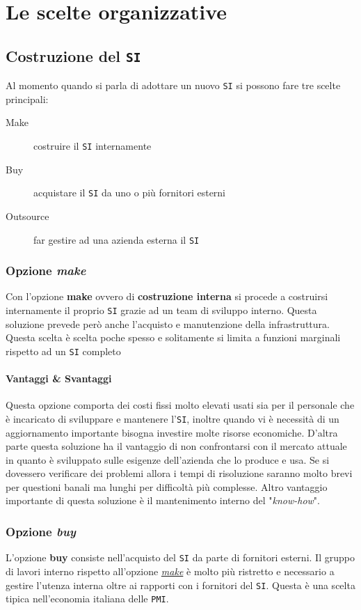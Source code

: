 \chapter{Le scelte organizzative}
\thispagestyle{chapterInit}
\section{Costruzione del \texttt{SI}}
    Al momento quando si parla di adottare un nuovo \texttt{SI} si possono fare tre scelte principali:
    \begin{description}
        \item[Make] costruire il \texttt{SI} internamente
        \item[Buy] acquistare il \texttt{SI} da uno o più fornitori esterni
        \item[Outsource] far gestire ad una azienda esterna il \texttt{SI}
    \end{description}
    \subsection{Opzione \textit{make}}
    \label{sec:opzMake}
        Con l'opzione \textbf{make} ovvero di \textbf{costruzione interna} si procede a costruirsi internamente il proprio \texttt{SI} grazie ad un team di sviluppo interno. Questa soluzione prevede però anche l'acquisto e manutenzione della infrastruttura.\newline
        Questa scelta è scelta poche spesso e solitamente si limita a funzioni marginali rispetto ad un \texttt{SI} completo
        \subsubsection{Vantaggi \& Svantaggi} 
        Questa opzione comporta dei costi fissi molto elevati usati sia per il personale che è incaricato di sviluppare e mantenere l'\texttt{SI}, inoltre quando vi è necessità di un aggiornamento importante bisogna investire molte risorse economiche. D'altra parte questa soluzione ha il vantaggio di non confrontarsi con il mercato attuale in quanto è sviluppato sulle esigenze dell'azienda che lo produce e usa. Se si dovessero verificare dei problemi allora i tempi di risoluzione saranno molto brevi per questioni banali ma lunghi per difficoltà più complesse. Altro vantaggio importante di questa soluzione è il mantenimento interno del "\textit{know-how}".
    \subsection{Opzione \textit{buy}}
        \label{sec:opzBuy}
        L'opzione \textbf{buy} consiste nell'acquisto del \texttt{SI} da parte di fornitori esterni. Il gruppo di lavori interno rispetto all'opzione \hyperref[sec:opzMake]{\textit{make}} è molto più ristretto e necessario a gestire l'utenza interna oltre ai rapporti con i fornitori del \texttt{SI}. Questa è una scelta tipica nell'economia italiana delle \texttt{PMI}.
